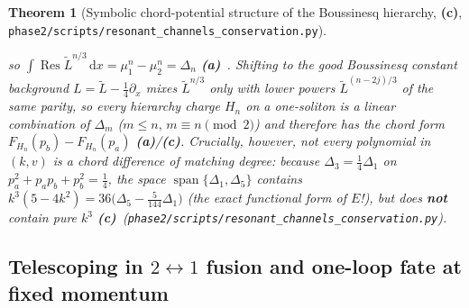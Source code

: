 \documentclass[11pt,a4paper]{article}
\newcommand{\La}{\textsf{\textbf{(a)}}\xspace}
\newcommand{\Lc}{\textsf{\textbf{(c)}}\xspace}
\newcommand{\dd}{\mathrm{d}}
\newcommand{\Res}{\operatorname{Res}}
\newcommand{\scons}{\texttt{phase2/\allowbreak scripts/\allowbreak resonant\_\allowbreak channels\_\allowbreak conservation.py}}
\newtheorem{theorem}[proposition]{Theorem}
\theoremstyle{remark}
\begin{document}
\begin{theorem}[Symbolic chord-potential structure of the Boussinesq hierarchy, \Lc, \scons]
\begin{enumerate}
so $\int\Res\tilde{L}^{n/3}\,\dd x = \mu_1^n - \mu_2^n = \Delta_n$ \La~\cite{Dickey}.
Shifting to the good Boussinesq constant background $L = \tilde{L} - \frac{1}{4}\partial_x$
mixes $\tilde{L}^{n/3}$ only with lower powers $\tilde{L}^{(n-2j)/3}$ of the
same parity, so every hierarchy charge $H_n$ on a one-soliton is a linear
combination of $\Delta_m$ ($m\le n,\,m\equiv n\pmod 2$) and therefore has the
chord form $F_{H_n}(p_b) - F_{H_n}(p_a)$ \La/\Lc.
Crucially, however, \emph{not every} polynomial in $(k,v)$ is a chord difference
of matching degree: because $\Delta_3 = \frac{1}{4}\Delta_1$ on
$p_a^2+p_a p_b+p_b^2=\frac{1}{4}$, the space $\operatorname{span}\{\Delta_1,\Delta_5\}$
contains $k^3(5-4k^2) = 36\big(\Delta_5 - \frac{5}{144}\Delta_1\big)$ (the exact
functional form of $E$!), but does \textbf{not} contain pure $k^3$ \Lc\ (\scons).
\end{enumerate}
\end{theorem}

\subsection{Telescoping in \texorpdfstring{$2\leftrightarrow 1$}{2<->1} fusion and one-loop fate at fixed momentum}
\end{document}
